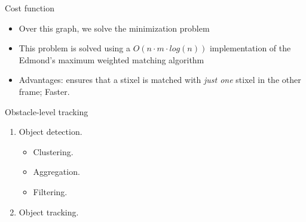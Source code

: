 \begin{frame}{Cost function}
{\begin{itemize}
      \item Over this graph, we solve the minimization problem
      \item This problem is solved using a $O(n \cdot m \cdot log(n))$ implementation of the Edmond's maximum weighted matching algorithm
      \item Advantages: ensures that a stixel is matched with \emph{just one} stixel in the other frame; Faster.
    \end{itemize}
  }
\end{frame}


\begin{frame}{Obstacle-level tracking}
  \begin{enumerate}
    \item Object detection.
    \begin{itemize}
     \item Clustering.
     \item Aggregation.
     \item Filtering.
    \end{itemize}

    \item Object tracking.
  \end{enumerate}
  
\end{frame}


